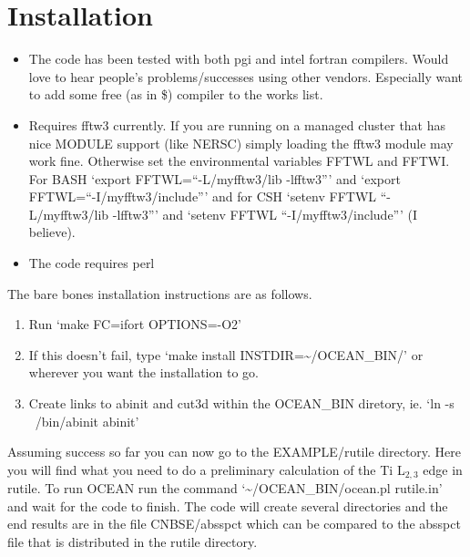 \documentclass[11pt]{report}
\begin{document}
\appendix
\chapter{Installation}
\begin{itemize}
\item The code has been tested with both pgi and intel fortran compilers. Would love to hear people's problems/successes using other vendors. Especially want to add some free (as in \$) compiler to the works list.
\item Requires fftw3 currently. If you are running on a managed cluster that has nice MODULE support (like NERSC) simply loading the fftw3 module may work fine. Otherwise set the environmental variables FFTWL and FFTWI. For BASH `export FFTWL=``-L/myfftw3/lib -lfftw3''' and `export FFTWL=``-I/myfftw3/include''' and for CSH `setenv FFTWL ``-L/myfftw3/lib -lfftw3''' and `setenv FFTWL ``-I/myfftw3/include'''  (I believe).
\item The code requires perl
\end{itemize}

The bare bones installation instructions are as follows.

\begin{enumerate}
\item{ Run `make FC=ifort OPTIONS=-O2'}
\item{ If this doesn't fail, type `make install INSTDIR=\textasciitilde/OCEAN\_BIN/' or wherever you want the installation to go.}
\item{ Create links to abinit and cut3d within the OCEAN\_BIN diretory, ie. `ln -s ~/bin/abinit abinit'}
\end{enumerate}

Assuming success so far you can now go to the EXAMPLE/rutile directory. Here you will find what you need to do a preliminary 
calculation of the Ti L$_{2,3}$ edge in rutile. To run OCEAN run the command `\textasciitilde/OCEAN\_BIN/ocean.pl rutile.in' 
and wait for the code to finish. The code will create several directories and the end results are in the file CNBSE/absspct which can 
be compared to the absspct file that is distributed in the rutile directory.  


\end{document}
